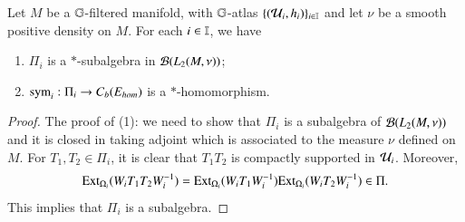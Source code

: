 \documentclass[leqno]{amsart}
\begin{document}
	\begin{lemma}\label{subalgebra-homomorphism}
		Let $M$ be a $\mathbb{G}$-filtered manifold, with $\mathbb{G}$-atlas $\{({\mathcal U}_{i},h_{i})\}_{i\in\mathbb I}$ and let $\nu$ be a smooth positive density on $M$. For each $i\in\mathbb I$, we have
		\begin{enumerate}[\rm(1)]
			\item $\Pi_{i}$ is a $*$-subalgebra in ${\mathcal B}(L_{2}(M,\nu))$;
			\item ${\rm sym}_{i}:\Pi_{i}\rightarrow C_{b}(E_{hom})$ is a $*$-homomorphism.
		\end{enumerate}
	\end{lemma}
	\begin{proof}
		The proof of (1): we need to show that $\Pi_{i}$ is a subalgebra of ${\mathcal B}(L_{2}(M,\nu))$ and it is closed in taking adjoint which is associated to the measure $\nu$ defined on $M$. 
		For $T_{1},T_{2}\in\Pi_{i}$, it is clear that $T_{1}T_{2}$ is compactly supported in ${\mathcal U}_{i}$. Moreover,
		\begin{align*}
			{\rm Ext}_{\Omega_{i}}(W_{i}T_{1}T_{2} W_{i}^{-1})={\rm Ext}_{\Omega_{i}}(W_{i}T_{1} W_{i}^{-1}){\rm Ext}_{\Omega_{i}}(W_{i}T_{2} W_{i}^{-1})\in\Pi.
		\end{align*}
		This implies that $\Pi_{i}$ is a subalgebra.
		

\end{proof}
\end{document}
